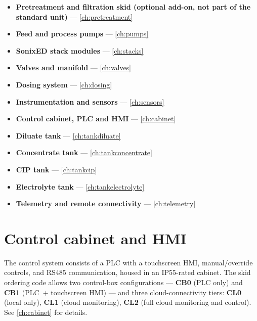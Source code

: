 \documentclass[a4paper,11pt,twoside,openright,numbers=noenddot]{scrreprt}
\newcommand{\sonixed}{SonixED\texttrademark\xspace}
\begin{document}
\begin{itemize}
\item \textbf{Pretreatment and filtration skid (optional add-on, not
  part of the standard unit)} --- \cref{ch:pretreatment}
\item \textbf{Feed and process pumps} --- \cref{ch:pumps}
\item \textbf{\sonixed stack modules} --- \cref{ch:stacks}
\item \textbf{Valves and manifold} --- \cref{ch:valves}
\item \textbf{Dosing system} --- \cref{ch:dosing}
\item \textbf{Instrumentation and sensors} --- \cref{ch:sensors}
\item \textbf{Control cabinet, PLC and HMI} --- \cref{ch:cabinet}
\item \textbf{Diluate tank} --- \cref{ch:tankdiluate}
\item \textbf{Concentrate tank} --- \cref{ch:tankconcentrate}
\item \textbf{CIP tank} --- \cref{ch:tankcip}
\item \textbf{Electrolyte tank} --- \cref{ch:tankelectrolyte}
\item \textbf{Telemetry and remote connectivity} --- \cref{ch:telemetry}
\end{itemize}

\section{Control cabinet and HMI}
The control system consists of a PLC with a touchscreen HMI, manual/override
controls, and RS485 communication, housed in an IP55-rated cabinet. The
skid ordering code allows two control-box configurations --- \textbf{CB0}
(PLC only) and \textbf{CB1} (PLC~+ touchscreen HMI) --- and three
cloud-connectivity tiers: \textbf{CL0} (local only), \textbf{CL1} (cloud
monitoring), \textbf{CL2} (full cloud monitoring and control). See
\cref{ch:cabinet} for details.
\end{document}
